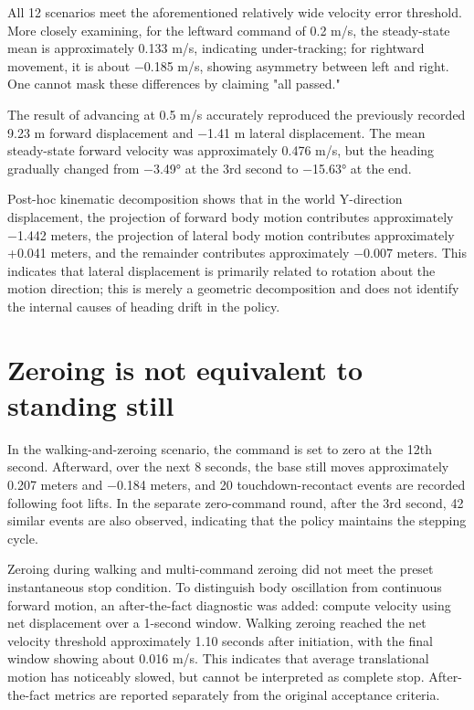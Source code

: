 All 12 scenarios meet the aforementioned relatively wide velocity error threshold. More closely examining, for the leftward command of 0.2 m/s, the steady-state mean is approximately 0.133 m/s, indicating under-tracking; for rightward movement, it is about −0.185 m/s, showing asymmetry between left and right. One cannot mask these differences by claiming "all passed."



The result of advancing at 0.5 m/s accurately reproduced the previously recorded 9.23 m forward displacement and −1.41 m lateral displacement. The mean steady-state forward velocity was approximately 0.476 m/s, but the heading gradually changed from −3.49° at the 3rd second to −15.63° at the end.

Post-hoc kinematic decomposition shows that in the world Y-direction displacement, the projection of forward body motion contributes approximately −1.442 meters, the projection of lateral body motion contributes approximately +0.041 meters, and the remainder contributes approximately −0.007 meters. This indicates that lateral displacement is primarily related to rotation about the motion direction; this is merely a geometric decomposition and does not identify the internal causes of heading drift in the policy.


\section{Zeroing is not equivalent to standing still}\label{ux5f52ux96f6ux5e76ux4e0dux7b49ux4e8eux7ad9ux5b9a}

In the walking-and-zeroing scenario, the command is set to zero at the 12th second. Afterward, over the next 8 seconds, the base still moves approximately 0.207 meters and −0.184 meters, and 20 touchdown-recontact events are recorded following foot lifts. In the separate zero-command round, after the 3rd second, 42 similar events are also observed, indicating that the policy maintains the stepping cycle.

Zeroing during walking and multi-command zeroing did not meet the preset instantaneous stop condition. To distinguish body oscillation from continuous forward motion, an after-the-fact diagnostic was added: compute velocity using net displacement over a 1-second window. Walking zeroing reached the net velocity threshold approximately 1.10 seconds after initiation, with the final window showing about 0.016 m/s. This indicates that average translational motion has noticeably slowed, but cannot be interpreted as complete stop. After-the-fact metrics are reported separately from the original acceptance criteria.

